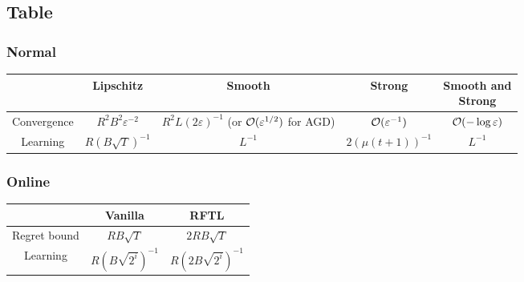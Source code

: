 \documentclass[12pt]{extarticle}
\numberwithin{equation}{subsection}
\begin{document}
\subsection{Table}

\subsubsection{Normal}

\begin{table}[H]
	\centering
	\def\arraystretch{2}
	\begin{tabular}{|c|c|c|c|c|}
		\hline
		                            &
		\textbf{Lipschitz}          &
		\textbf{Smooth}             &
		\textbf{Strong}             &
		\makecell{\textbf{Smooth and}          \\ \textbf{Strong}}
		\\
		\hline
		Convergence                 &
		$ R^2 B^2 \varepsilon^{-2}$ &
		\makecell{$ R^2 L (2\varepsilon)^{-1}$ \\ (or $\mathcal{O}(\varepsilon^{1/2})$ for AGD)} &
		$ \mathcal{O} (\varepsilon^{-1})$    &
		$ \mathcal{O} (-\log  \varepsilon)$
		\\
		\hline
		Learning                    &
		$R (B \sqrt{T})^{-1}$       &
		$L^{-1}$                    &
		$ 2 (\mu (t + 1))^{-1}$     &
		$L^{-1}$
		\\
		\hline
	\end{tabular}
\end{table}

\subsubsection{Online}

\begin{table}[H]
	\centering
	\def\arraystretch{2}
	\begin{tabular}{|c|c|c|}
		\hline                  &
		\textbf{Vanilla}        &
		\textbf{RFTL}
		\\
		\hline
		Regret bound            &
		$ RB \sqrt T$           &
		$ 2RB \sqrt T  $
		\\
		\hline
		Learning                &
		$R (B \sqrt{2^i})^{-1}$ &
		$ R (2 B \sqrt{2^i})^{-1}$
		\\
		\hline
	\end{tabular}
\end{table}
\end{document}
